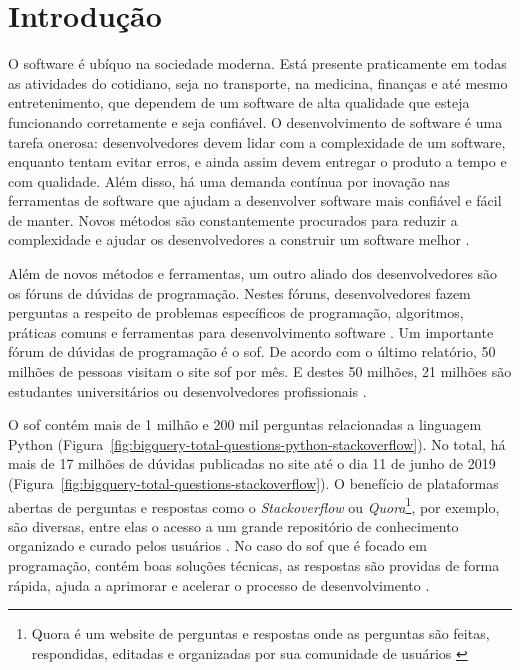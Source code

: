 \chapter{Introdução}
\label{cap:introducao}

O software é ubíquo na sociedade moderna. Está presente praticamente em todas as atividades do cotidiano, seja no transporte, na medicina, finanças e até mesmo entretenimento, que dependem de um software de alta qualidade que esteja funcionando corretamente e seja confiável. O desenvolvimento de software é uma tarefa onerosa: desenvolvedores devem lidar com a complexidade de um software, enquanto tentam evitar erros, e ainda assim devem entregar o produto a tempo e com qualidade. Além disso, há uma demanda contínua por inovação nas ferramentas de software que ajudam a desenvolver software mais confiável e fácil de manter. Novos métodos são constantemente procurados para reduzir a complexidade e ajudar os desenvolvedores a construir um software melhor \citep{Allamanis:2018:SML}.

Além de novos métodos e ferramentas, um outro aliado dos desenvolvedores são os fóruns de dúvidas de programação. Nestes fóruns, desenvolvedores fazem perguntas a respeito de problemas específicos de programação, algoritmos, práticas comuns e ferramentas para desenvolvimento software \citep{stackoverflow-questions-topics-2019}. Um importante fórum de dúvidas de programação é o \Gls{sof}. De acordo com o último relatório, 50 milhões de pessoas visitam o site \Gls{sof} por mês. E destes 50 milhões, 21 milhões são estudantes universitários ou desenvolvedores profissionais \citep{stackoverflow-survey-2019}.

O \Gls{sof} contém mais de 1 milhão e 200 mil perguntas relacionadas a linguagem Python (Figura~\ref{fig:bigquery-total-questions-python-stackoverflow}). No total, há mais de 17 milhões de dúvidas publicadas no site até o dia 11 de junho de 2019 (Figura~\ref{fig:bigquery-total-questions-stackoverflow}). O benefício de plataformas abertas de perguntas e respostas como o \textit{Stackoverflow} ou \textit{Quora}\footnote{Quora é um website de perguntas e respostas onde as perguntas são feitas, respondidas, editadas e organizadas por sua comunidade de usuários \citep{wikipedia-quora-2019}}, por exemplo,  são diversas, entre elas o acesso a um grande repositório de conhecimento organizado e curado pelos usuários \citep{Wang-quora:2013}. No caso do \Gls{sof} que é focado em programação, contém boas soluções técnicas, as respostas são providas de forma rápida, ajuda a aprimorar e acelerar o processo de desenvolvimento \citep{Vasilescu:2013}.

